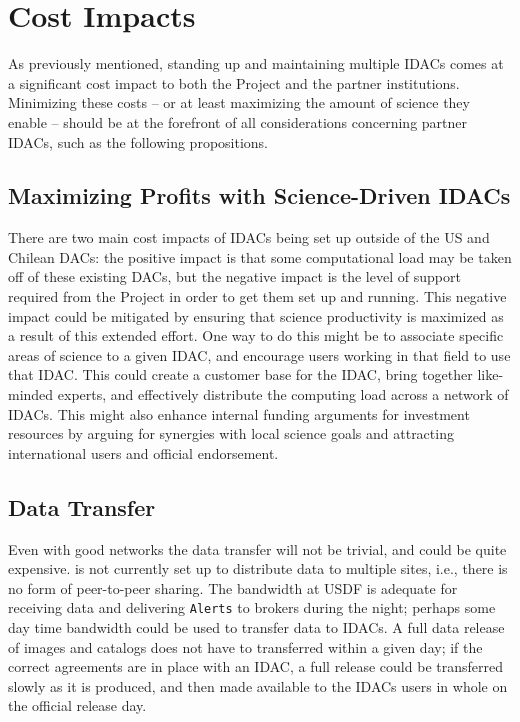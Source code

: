 \section{Cost Impacts}\label{sec:costs}

As previously mentioned, standing up and maintaining multiple IDACs comes at a significant cost impact to both the \RO Project and the partner institutions. Minimizing these costs -- or at least maximizing the amount of science they enable -- should be at the forefront of all considerations concerning partner IDACs, such as the following propositions.

\subsection{Maximizing Profits with Science-Driven IDACs}
There are two main cost impacts of IDACs being set up outside of the \gls{US} and Chilean DACs: the positive impact is that some computational load may be taken off of these existing DACs, but the negative impact is the level of support required from the \RO Project in order to get them set up and running. This negative impact could be mitigated by ensuring that science productivity is maximized as a result of this extended effort. One way to do this might be to associate specific areas of science to a given \gls{IDAC}, and encourage users working in that field to use that \gls{IDAC}. This could create a customer base for the \gls{IDAC}, bring together like-minded experts, and effectively distribute the computing load across a network of IDACs. This might also enhance internal funding arguments for investment resources by arguing for synergies with local science goals and attracting international users and official endorsement.

\subsection{Data Transfer}\label{sec:xfer}
Even with good networks the data transfer will not be trivial, and could be quite expensive. \RO is not currently set up to distribute data to multiple sites, i.e., there is no form of peer-to-peer sharing. The bandwidth at \gls{USDF} is adequate for receiving data and delivering {\tt Alerts} to brokers during the night; perhaps some day time bandwidth could be used to transfer data to IDACs. A full data release of images and catalogs does not have to transferred within a given day; if the correct agreements are in place with an \gls{IDAC}, a full release could be transferred slowly as it is produced, and then made available to the IDACs users in whole on the official release day.


